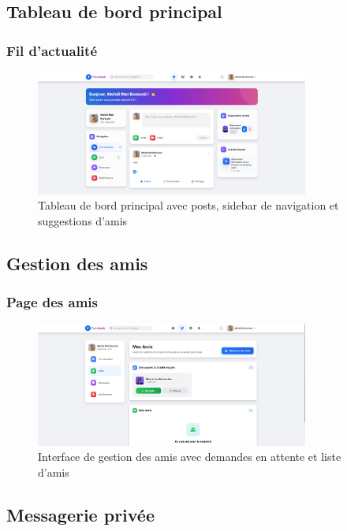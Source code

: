 \documentclass[12pt,a4paper]{article}
\begin{document}
\subsection{Tableau de bord principal}

\subsubsection{Fil d'actualit\'e}
\begin{figure}[H]
    \centering
    \includegraphics[width=0.8\textwidth]{screenshots/dashboard.png}
    \caption{Tableau de bord principal avec posts, sidebar de navigation et suggestions d'amis}
    \label{fig:dashboard}
\end{figure}

\subsection{Gestion des amis}

\subsubsection{Page des amis}
\begin{figure}[H]
    \centering
    \includegraphics[width=0.8\textwidth]{screenshots/friends.png}
    \caption{Interface de gestion des amis avec demandes en attente et liste d'amis}
    \label{fig:friends}
\end{figure}

\subsection{Messagerie priv\'ee}
\end{document}
